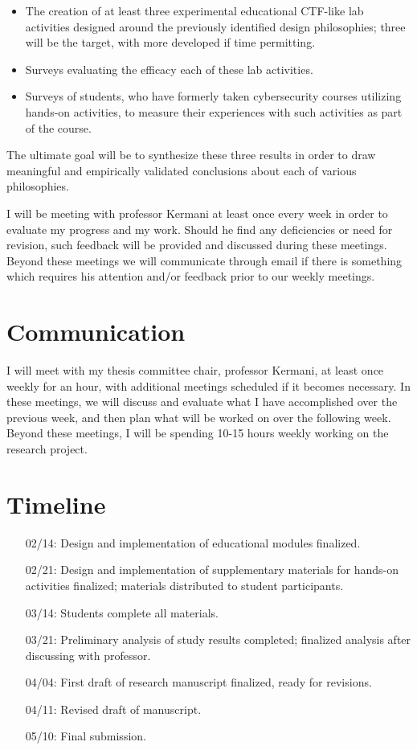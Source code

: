\documentclass{article}
\begin{document}
    \begin{itemize}
        \item The creation of at least three experimental educational CTF-like lab activities designed around the previously identified design philosophies; %
three will be the target, with more developed if time permitting.
        \item Surveys evaluating the efficacy each of these lab activities.
        \item Surveys of students, who have formerly taken cybersecurity courses utilizing hands-on activities, to measure their experiences with such activities as part of the course. 
    \end{itemize}

    The ultimate goal will be to synthesize these three results in order to draw meaningful and empirically validated conclusions about each of various philosophies.
    
        I will be meeting with professor Kermani at least once every week in order to evaluate my progress and my work. %
Should he find any deficiencies or need for revision, such feedback will be provided and discussed during these meetings. %
Beyond these meetings we will communicate through email if there is something which requires his attention and/or feedback prior to our weekly meetings. 

\section{Communication}

    I will meet with my thesis committee chair, professor Kermani, at least once weekly for an hour, with additional meetings scheduled if it becomes necessary. %
In these meetings, we will discuss and evaluate what I have accomplished over the previous week, and then plan what will be worked on over the following week. %
Beyond these meetings, I will be spending 10-15 hours weekly working on the research project. %
     
\section{Timeline}

    \begin{itemize}
        \item [02/14:] Design and implementation of educational modules finalized.
        \item [02/21:] Design and implementation of supplementary materials for hands-on activities finalized; %
materials distributed to student participants.
        \item [03/14:] Students complete all materials.
        \item [03/21:] Preliminary analysis of study results completed; %
finalized analysis after discussing with professor.
        \item [04/04:] First draft of research manuscript finalized, ready for revisions.
        \item [04/11:] Revised draft of manuscript.
        \item [05/10:] Final submission.
    \end{itemize}
\end{document}
